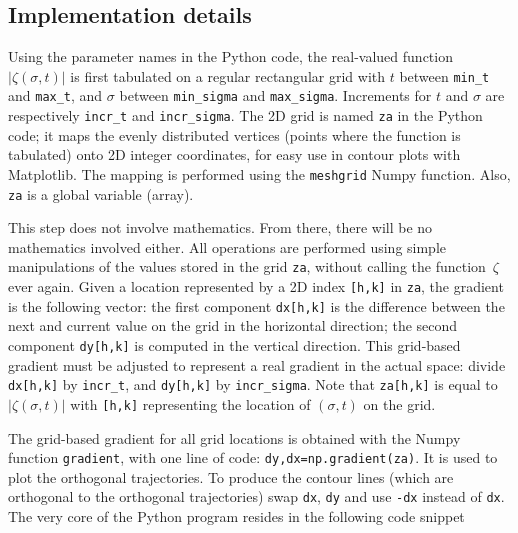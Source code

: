 \documentclass[oneside,10pt]{book}
\begin{document}
\subsection{Implementation details}\label{porbug}

Using the parameter names in the Python code, 
the real-valued function $|\zeta(\sigma, t)|$ is first tabulated on a regular rectangular grid with $t$ between
\texttt{min\_t} and \texttt{max\_t}, and $\sigma$ between \texttt{min\_sigma} and \texttt{max\_sigma}. Increments for
 $t$ and $\sigma$ are respectively \texttt{incr\_t} and \texttt{incr\_sigma}. The 2D grid is named \texttt{za} in the Python code;
 it maps the evenly distributed vertices (points where the function is tabulated) onto 2D integer coordinates,  for easy use in contour plots with Matplotlib.  
 The mapping is performed using the \texttt{meshgrid} Numpy function. Also, \texttt{za} is a global variable (array). 

This step does not involve mathematics. From there, there will be no mathematics involved either. All operations are performed using simple manipulations of the values stored in the grid \texttt{za}, without calling the function~$\zeta$ ever again. Given
 a location represented by a 2D index \texttt{[h,k]} in \texttt{za}, the gradient is  the following vector: the first component \texttt{dx[h,k]} is the difference between the next and current value on the grid in the horizontal direction; the second component \texttt{dy[h,k]} is computed in the vertical direction. This grid-based gradient must be 
 adjusted to represent a real gradient in the actual space: divide \texttt{dx[h,k]} by \texttt{incr\_t}, and \texttt{dy[h,k]} by \texttt{incr\_sigma}.
Note that \texttt{za[h,k]} is equal to $|\zeta(\sigma, t)|$ with \texttt{[h,k]} representing the location of $(\sigma, t)$ on the grid.

The grid-based gradient for all grid locations is obtained with the Numpy function \texttt{gradient}, with one line of code: \texttt{dy,dx=np.gradient(za)}. It is used to plot the orthogonal trajectories. To produce the contour lines (which are orthogonal to the orthogonal trajectories)
 swap \texttt{dx}, \texttt{dy} and use \texttt{-dx} instead of \texttt{dx}. The very core of the Python program resides in the following code snippet \vspace{1ex}
\end{document}
